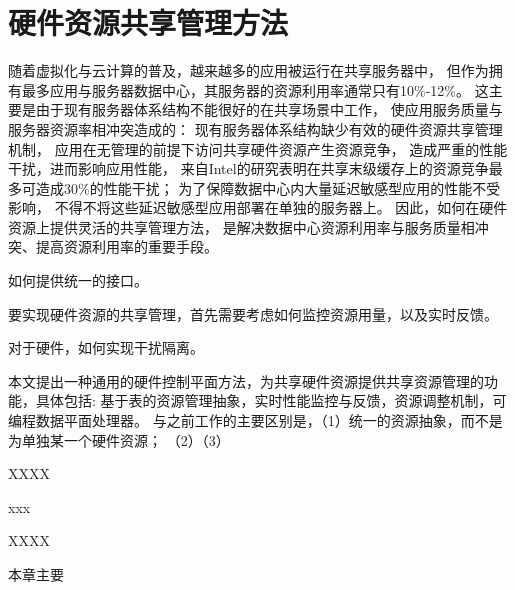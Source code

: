 

\chapter{硬件资源共享管理方法}
\label{chap:hwresman}

随着虚拟化与云计算的普及，越来越多的应用被运行在共享服务器中，
但作为拥有最多应用与服务器数据中心，其服务器的资源利用率通常只有10\%-12\%。
这主要是由于现有服务器体系结构不能很好的在共享场景中工作，
使应用服务质量与服务器资源率相冲突造成的：
现有服务器体系结构缺少有效的硬件资源共享管理机制，
应用在无管理的前提下访问共享硬件资源产生资源竞争，
造成严重的性能干扰，进而影响应用性能，
来自Intel的研究\cite{intel}表明在共享末级缓存上的资源竞争最多可造成30\%的性能干扰；
为了保障数据中心内大量延迟敏感型应用的性能不受影响，
不得不将这些延迟敏感型应用部署在单独的服务器上\cite{}。
因此，如何在硬件资源上提供灵活的共享管理方法，
是解决数据中心资源利用率与服务质量相冲突、提高资源利用率的重要手段。

如何提供统一的接口。 %

要实现硬件资源的共享管理，首先需要考虑如何监控资源用量，以及实时反馈。 %

对于硬件，如何实现干扰隔离。 %

本文提出一种通用的硬件控制平面方法，为共享硬件资源提供共享资源管理的功能，具体包括:
基于表的资源管理抽象，实时性能监控与反馈，资源调整机制，可编程数据平面处理器。
与之前工作的主要区别是，（1）统一的资源抽象，而不是为单独某一个硬件资源；
（2）（3）

XXXX

xxx

XXXX

本章主要




